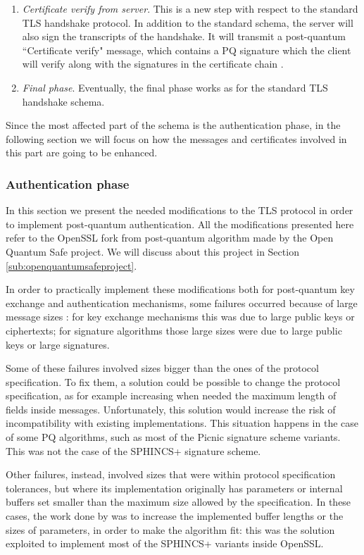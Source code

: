 \documentclass[a4paper,12pt]{article}
\begin{document}
\begin{enumerate}
    \item \textit{Certificate verify from server}. This is a new step with respect to the standard TLS handshake protocol. In addition to the standard schema, the server will also sign the transcripts of the handshake. It will transmit a post-quantum ``Certificate verify" message, which contains a PQ signature which the client will verify along with the signatures in the certificate chain \cite{5_postquantum_signature_usecase}.
    \item \textit{Final phase}. Eventually, the final phase works as for the standard TLS handshake schema.
\end{enumerate}

Since the most affected part of the schema is the authentication phase, in the following section we will focus on how the messages and certificates involved in this part are going to be enhanced.

\subsubsection{Authentication phase}

In this section we present the needed modifications to the TLS protocol in order to implement post-quantum authentication. All the modifications presented here refer to the OpenSSL fork from post-quantum algorithm made by the Open Quantum Safe project. We will discuss about this project in Section \ref{sub:openquantumsafeproject}. 

In order to practically implement these modifications both for post-quantum key exchange and authentication mechanisms, some failures occurred because of large message sizes \cite{6_NISTPQC_TLS_SSH}: for key exchange mechanisms this was due to large public keys or ciphertexts; for signature algorithms those large sizes were due to large public keys or large signatures.

Some of these failures involved sizes bigger than the ones of the protocol specification. To fix them, a solution could be possible to change the protocol specification, as for example increasing when needed the maximum length of fields inside messages. Unfortunately, this solution would increase the risk of incompatibility with existing implementations. This situation happens in the case of some PQ algorithms, such as most of the Picnic signature scheme variants. This was not the case of the SPHINCS+ signature scheme.

Other failures, instead, involved sizes that were within protocol specification tolerances, but where its implementation originally has parameters or internal buffers set smaller than the maximum size allowed by the specification.
In these cases, the work done by \cite{6_NISTPQC_TLS_SSH} was to increase the implemented buffer lengths or the sizes of parameters, in order to make the algorithm fit: this was the solution exploited to implement most of the SPHINCS+ variants inside OpenSSL.
\end{document}
